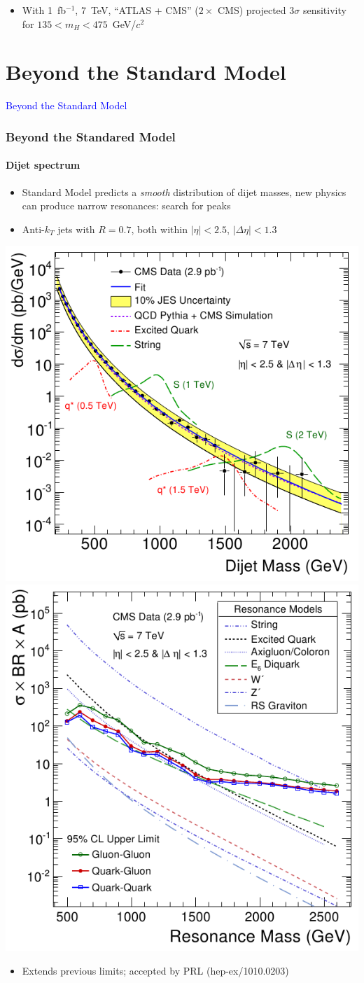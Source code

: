 \documentclass[compress]{beamer}
\begin{document}
\begin{frame}
\vspace{-0.3 cm}
\begin{itemize}
\item With 1~fb$^{-1}$, 7~TeV, ``ATLAS + CMS'' ($2\times$ CMS)
  projected $3\sigma$ sensitivity for $135 < m_H < 475$~GeV/$c^2$
\end{itemize}
\end{frame}

\section*{Beyond the Standard Model}
\begin{frame}
\begin{center}
\Huge \textcolor{blue}{Beyond the Standard Model}
\end{center}
\end{frame}

\begin{frame}
\frametitle{Beyond the Standared Model}
\framesubtitle{Dijet spectrum}
\begin{itemize}
\item Standard Model predicts a {\it smooth} distribution of dijet
  masses, new physics can produce narrow resonances: search for peaks

\item Anti-$k_T$ jets with $R=0.7$, both within $|\eta| < 2.5$, $|\Delta\eta| < 1.3$
\end{itemize}

\includegraphics[height=5.3 cm]{dijet_spectrum.png} \hfill
\includegraphics[height=5.3 cm]{dijet_limits.png}

\begin{itemize}
\item Extends previous limits; accepted by PRL (hep-ex/1010.0203)
\end{itemize}
\end{frame}
\end{document}
